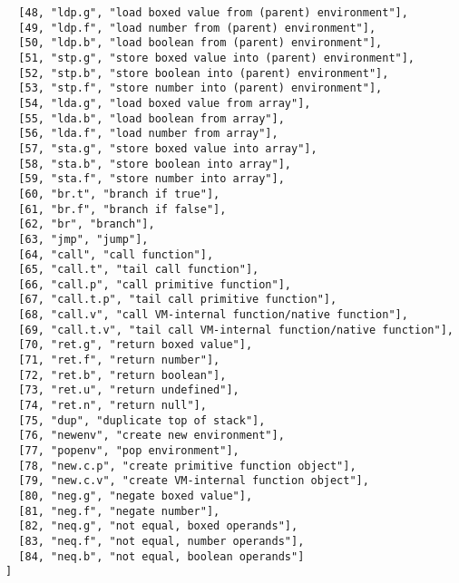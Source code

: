 \begin{verbatim}
  [48, "ldp.g", "load boxed value from (parent) environment"],
  [49, "ldp.f", "load number from (parent) environment"],
  [50, "ldp.b", "load boolean from (parent) environment"],
  [51, "stp.g", "store boxed value into (parent) environment"],
  [52, "stp.b", "store boolean into (parent) environment"],
  [53, "stp.f", "store number into (parent) environment"],
  [54, "lda.g", "load boxed value from array"],
  [55, "lda.b", "load boolean from array"],
  [56, "lda.f", "load number from array"],
  [57, "sta.g", "store boxed value into array"],
  [58, "sta.b", "store boolean into array"],
  [59, "sta.f", "store number into array"],
  [60, "br.t", "branch if true"],
  [61, "br.f", "branch if false"],
  [62, "br", "branch"],
  [63, "jmp", "jump"],
  [64, "call", "call function"],
  [65, "call.t", "tail call function"],
  [66, "call.p", "call primitive function"],
  [67, "call.t.p", "tail call primitive function"],
  [68, "call.v", "call VM-internal function/native function"],
  [69, "call.t.v", "tail call VM-internal function/native function"],
  [70, "ret.g", "return boxed value"],
  [71, "ret.f", "return number"],
  [72, "ret.b", "return boolean"],
  [73, "ret.u", "return undefined"],
  [74, "ret.n", "return null"],
  [75, "dup", "duplicate top of stack"],
  [76, "newenv", "create new environment"],
  [77, "popenv", "pop environment"],
  [78, "new.c.p", "create primitive function object"],
  [79, "new.c.v", "create VM-internal function object"],
  [80, "neg.g", "negate boxed value"],
  [81, "neg.f", "negate number"],
  [82, "neq.g", "not equal, boxed operands"],
  [83, "neq.f", "not equal, number operands"],
  [84, "neq.b", "not equal, boolean operands"]
]
\end{verbatim}

